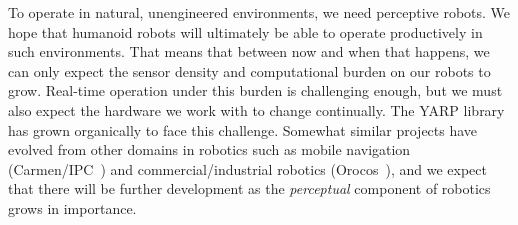 
To operate in natural, unengineered environments, we need perceptive
robots.  We hope that humanoid robots will ultimately be able to
operate productively in such environments.  That means that between
now and when that happens, we can only expect the sensor density and
computational burden on our robots to grow.  Real-time operation under
this burden is challenging enough, but we must also expect the
hardware we work with to change continually.  The YARP library
has grown organically to face this challenge.
%
%
Somewhat similar projects have evolved from other domains in robotics
such as mobile navigation (Carmen/IPC~\cite{roy03IROS}) and
commercial/industrial robotics (Orocos~\cite{soetens05orocos}),
and we expect that there will be further development as the
{\em perceptual} component of robotics grows in importance.